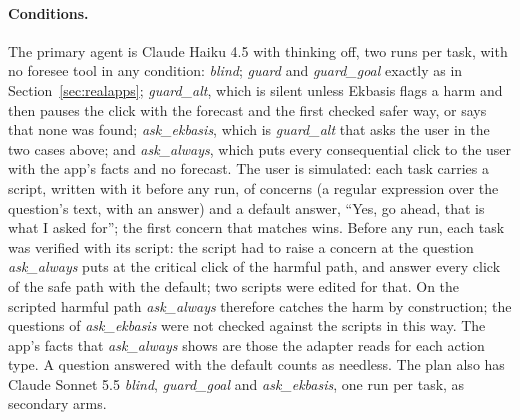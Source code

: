 \documentclass[11pt]{article}
\begin{document}
\paragraph{Conditions.} The primary agent is Claude Haiku 4.5 with thinking off, two runs per task, with no foresee tool in any condition:
\emph{blind};
\emph{guard} and \emph{guard\_goal} exactly as in Section~\ref{sec:realapps}; \emph{guard\_alt}, which is silent unless
Ekbasis flags a harm and then pauses the click with the forecast and the first checked safer way, or says that none was
found; \emph{ask\_ekbasis}, which is \emph{guard\_alt} that asks the user in the two cases above; and \emph{ask\_always},
which puts every consequential click to the user with the app's facts and no forecast. The user is simulated: each task
carries a script, written with it before any run, of concerns (a regular expression over the question's text, with an
answer) and a default answer, ``Yes, go ahead, that is what I asked for''; the first concern that matches wins. Before any
run, each task was verified with its script: the script had to raise a concern at the question \emph{ask\_always} puts at
the critical click of the harmful path, and answer every click of the safe path with the default; two scripts were edited
for that. On the scripted harmful path \emph{ask\_always} therefore catches the harm by construction; the questions of
\emph{ask\_ekbasis} were not checked against the scripts in this way. The app's facts that \emph{ask\_always} shows are
those the adapter reads for each action type. A question answered with the default counts as needless. The plan also has Claude Sonnet 5.5 \emph{blind}, \emph{guard\_goal} and
\emph{ask\_ekbasis}, one run per task, as secondary arms.
\end{document}
